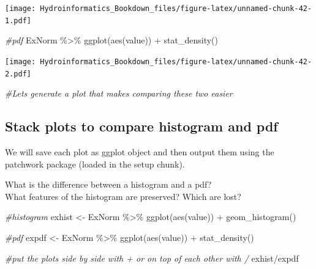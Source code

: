 \documentclass[
]{book}
\newenvironment{Shaded}{\begin{snugshade}}{\end{snugshade}}
\newcommand{\CommentTok}[1]{\textcolor[rgb]{0.56,0.35,0.01}{\textit{#1}}}
\newcommand{\FunctionTok}[1]{\textcolor[rgb]{0.00,0.00,0.00}{#1}}
\newcommand{\NormalTok}[1]{#1}
\newcommand{\OtherTok}[1]{\textcolor[rgb]{0.56,0.35,0.01}{#1}}
\newcommand{\SpecialCharTok}[1]{\textcolor[rgb]{0.00,0.00,0.00}{#1}}
\begin{document}
\texttt{[image: Hydroinformatics\_Bookdown\_files/figure-latex/unnamed-chunk-42-1.pdf]}

\begin{Shaded}
\begin{Highlighting}[]
\CommentTok{\#pdf}
\NormalTok{ExNorm }\SpecialCharTok{\%\textgreater{}\%}
  \FunctionTok{ggplot}\NormalTok{(}\FunctionTok{aes}\NormalTok{(value)) }\SpecialCharTok{+}
  \FunctionTok{stat\_density}\NormalTok{()}
\end{Highlighting}
\end{Shaded}

\texttt{[image: Hydroinformatics\_Bookdown\_files/figure-latex/unnamed-chunk-42-2.pdf]}

\begin{Shaded}
\begin{Highlighting}[]
\CommentTok{\#Let\textquotesingle{}s generate a plot that makes comparing these two easier}
\end{Highlighting}
\end{Shaded}

\hypertarget{stack-plots-to-compare-histogram-and-pdf}{%
\subsection{Stack plots to compare histogram and pdf}\label{stack-plots-to-compare-histogram-and-pdf}}

We will save each plot as ggplot object and then output them using the patchwork package (loaded in the setup chunk).

What is the difference between a histogram and a pdf?\\
What features of the histogram are preserved? Which are lost?

\begin{Shaded}
\begin{Highlighting}[]
\CommentTok{\#histogram}
\NormalTok{exhist }\OtherTok{\textless{}{-}}\NormalTok{ ExNorm }\SpecialCharTok{\%\textgreater{}\%}
  \FunctionTok{ggplot}\NormalTok{(}\FunctionTok{aes}\NormalTok{(value)) }\SpecialCharTok{+}
  \FunctionTok{geom\_histogram}\NormalTok{()}

\CommentTok{\#pdf}
\NormalTok{expdf }\OtherTok{\textless{}{-}}\NormalTok{ ExNorm }\SpecialCharTok{\%\textgreater{}\%}
  \FunctionTok{ggplot}\NormalTok{(}\FunctionTok{aes}\NormalTok{(value)) }\SpecialCharTok{+}
  \FunctionTok{stat\_density}\NormalTok{()}

\CommentTok{\#put the plots side by side with + or on top of each other with /}
\NormalTok{exhist}\SpecialCharTok{/}\NormalTok{expdf}
\end{Highlighting}
\end{Shaded}
\end{document}
